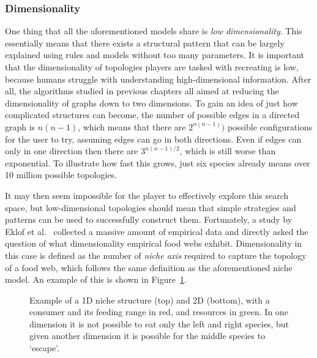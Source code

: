 \subsubsection{Dimensionality}
One thing that all the aforementioned models share is \emph{low dimensionality}. This essentially means that there exists a structural pattern that can be largely explained using rules and models without too many parameters.
It is important that the dimensionality of topologies players are tasked with recreating is low, because humans struggle with understanding high-dimensional information. After all, the algorithms studied in previous chapters all aimed at reducing the dimensionality of graphs down to two dimensions. To gain an idea of just how complicated structures can become, the number of possible edges in a directed graph is $n(n-1)$, which means that there are $2^{n(n-1)})$ possible configurations for the user to try, assuming edges can go in both directions. Even if edges can only in one direction then there are $3^{n(n-1)/2}$, which is still worse than exponential. To illustrate how fast this grows, just six species already means over 10 million possible topologies.

It may then seem impossible for the player to effectively explore this search space, but low-dimensional topologies should mean that simple strategies and patterns can be used to successfully construct them.
Fortunately, a study by Eklof et al.\ \cite{Eklof2013} collected a massive amount of empirical data and directly asked the question of what dimensionality empirical food webs exhibit. Dimensionality in this case is defined as the number of \emph{niche axis} required to capture the topology of a food web, which follows the same definition as the aforementioned niche model. An example of this is shown in Figure~\ref{fig:niche}.

\begin{figure}
  \caption{Example of a 1D niche structure (top) and 2D (bottom), with a consumer and its feeding range in red, and resources in green.
  In one dimension it is not possible to eat only the left and right species, but given another dimension it is possible for the middle species to `escape'.}
  \label{fig:niche}
\end{figure}

